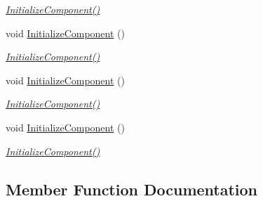 \begin{DoxyCompactItemize}
\begin{DoxyCompactList}\small\item\em \mbox{\hyperlink{class_r_f_storage_1_1_view_1_1_organisation_1_1_organisation_liste_udlevering_v_a696d504863e3dfaefd07879d4224ce2e}{Initialize\+Component()}} \end{DoxyCompactList}\item 
void \mbox{\hyperlink{class_r_f_storage_1_1_view_1_1_organisation_1_1_organisation_liste_udlevering_v_a696d504863e3dfaefd07879d4224ce2e}{Initialize\+Component}} ()
\begin{DoxyCompactList}\small\item\em \mbox{\hyperlink{class_r_f_storage_1_1_view_1_1_organisation_1_1_organisation_liste_udlevering_v_a696d504863e3dfaefd07879d4224ce2e}{Initialize\+Component()}} \end{DoxyCompactList}\item 
void \mbox{\hyperlink{class_r_f_storage_1_1_view_1_1_organisation_1_1_organisation_liste_udlevering_v_a696d504863e3dfaefd07879d4224ce2e}{Initialize\+Component}} ()
\begin{DoxyCompactList}\small\item\em \mbox{\hyperlink{class_r_f_storage_1_1_view_1_1_organisation_1_1_organisation_liste_udlevering_v_a696d504863e3dfaefd07879d4224ce2e}{Initialize\+Component()}} \end{DoxyCompactList}\item 
void \mbox{\hyperlink{class_r_f_storage_1_1_view_1_1_organisation_1_1_organisation_liste_udlevering_v_a696d504863e3dfaefd07879d4224ce2e}{Initialize\+Component}} ()
\begin{DoxyCompactList}\small\item\em \mbox{\hyperlink{class_r_f_storage_1_1_view_1_1_organisation_1_1_organisation_liste_udlevering_v_a696d504863e3dfaefd07879d4224ce2e}{Initialize\+Component()}} \end{DoxyCompactList}\end{DoxyCompactItemize}


\subsection{Member Function Documentation}
\mbox{\label{class_r_f_storage_1_1_view_1_1_organisation_1_1_organisation_liste_udlevering_v_a696d504863e3dfaefd07879d4224ce2e}} 

